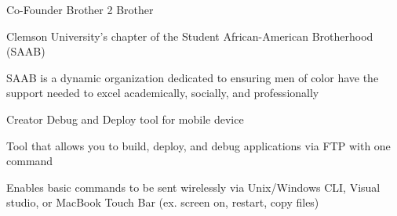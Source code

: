 

\begin{cventries}

  \cventry
    {Co-Founder} %
    {Brother 2 Brother} %
    {} %
    {} %
    {
      \begin{cvitems} %
        \item {Clemson University's chapter of the Student African-American Brotherhood (SAAB)}
        \item {SAAB is a dynamic organization dedicated to ensuring men of color have the support needed to excel academically, socially, and professionally}
      \end{cvitems}
    }

  \cventry
    {Creator} %
    {Debug and Deploy tool for mobile device} %
    {} %
    {} %
    {
      \begin{cvitems} %
        \item {Tool that allows you to build, deploy, and debug applications via FTP with one command}
        \item {Enables basic commands to be sent wirelessly via Unix/Windows CLI, Visual studio, or MacBook Touch Bar (ex. screen on, restart, copy files) }
      \end{cvitems}
    }


\end{cventries}
